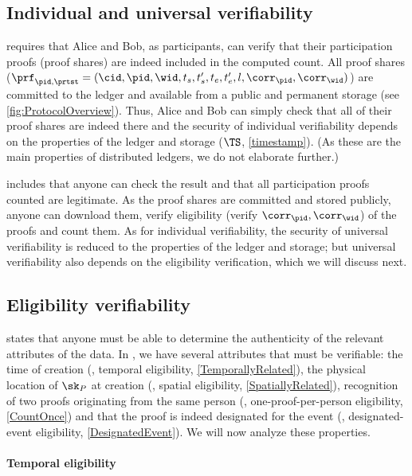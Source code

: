\subsection{Individual and universal verifiability}%
\label{analysis-individual}%
\label{analysis-universal}

 requires that Alice and Bob, as participants, can verify 
that their participation proofs (\ie proof shares) are indeed included in the 
computed count.
All proof shares (\ie \(\prf_{\pid, \prtst} = (\cid, \pid, \wid, t_s, t_s', 
  t_e, t_e', l, \corr_\pid, \corr_\wid)\)) are committed to the ledger and 
available from a public and permanent storage (see 
\cref{fig:ProtocolOverview}).
Thus, Alice and Bob can simply check that all of their proof shares are indeed 
there and the security of individual verifiability depends on the properties of 
the ledger and storage (\(\TS\), \cref{timestamp}).
(As these are the main properties of distributed ledgers, we do not elaborate 
further.)

 includes that anyone can check the result and that all 
participation proofs counted are legitimate.
As the proof shares are committed and stored publicly, anyone can
download them, verify eligibility (\ie verify \(\corr_\pid,
\corr_{\wid}\)) of the proofs and count them.
As for individual verifiability, the security of universal verifiability is 
reduced to the properties of the ledger and storage; but universal 
verifiability also depends on the eligibility verification, which we will 
discuss next.

\subsection{Eligibility verifiability}%
\label{analysis-eligibility}

 states that anyone must be able to determine the authenticity of the relevant attributes of the data.
In \CROCUS, we have several attributes that must be verifiable: the time of 
creation (\ie, temporal eligibility, \cref{TemporallyRelated}), the physical 
location of \(\sk_P\) at creation (\ie, spatial eligibility, 
\cref{SpatiallyRelated}), recognition of two proofs originating from the same 
person (\ie, one-proof-per-person eligibility, \cref{CountOnce}) and that the 
proof is indeed designated for the event (\ie, designated-event eligibility, 
\cref{DesignatedEvent}).
We will now analyze these properties.

\paragraph{Temporal eligibility}%
\label{analysis-temporal}

